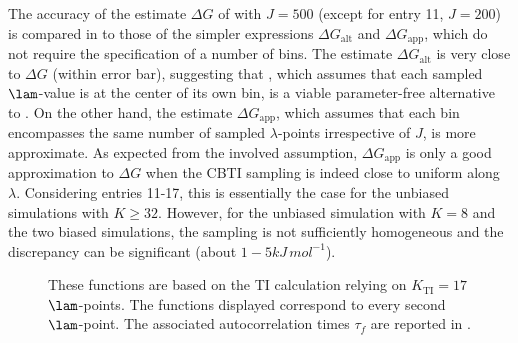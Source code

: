 The accuracy
of the estimate $\Delta G$ of  with $J=500$ (except for entry 11, $J = 200$)
is compared in 
to those of the simpler expressions $\Delta G_{\mathrm{alt}}$ and $\Delta G_{\mathrm{app}}$, which do not require the specification of a number of bins.
%
%
%
%
The estimate $\Delta G_{\mathrm{alt}}$ is very close to $\Delta G$ (within error bar),
suggesting that , which assumes that each sampled $\lam$-value
is at the center of its own bin, is a viable parameter-free alternative to . 
%
On the other hand, the estimate $\Delta G_{\mathrm{app}}$,
which assumes that each bin encompasses the same number of sampled $\lambda$-points
irrespective of $J$, is more approximate.
%
As expected from the involved assumption, $\Delta G_{\mathrm{app}}$ is only a good approximation
to $\Delta G$ when the CBTI sampling is indeed close to uniform along $\lambda$.
%
Considering entries 11-17, this is essentially the case for the unbiased simulations with $K\ge 32$.
%
However, for the unbiased simulation with $K=8$ and the two biased simulations, 
the sampling is not sufficiently homogeneous and the discrepancy can be significant
(about $1-5\unit{kJ\, mol^{-1}}$).



\begin{figure}[H]
  \centering
    \caption{\footnotesize{} These functions are based on the TI calculation relying on $K_{\mathrm{TI}}=17$ $\lam$-points. The functions displayed correspond to every second $\lam$-point. The associated autocorrelation times $\tau_{f}$ are reported in . 
}
    \label{fig:ti:tcf}
\end{figure}
\clearpage

